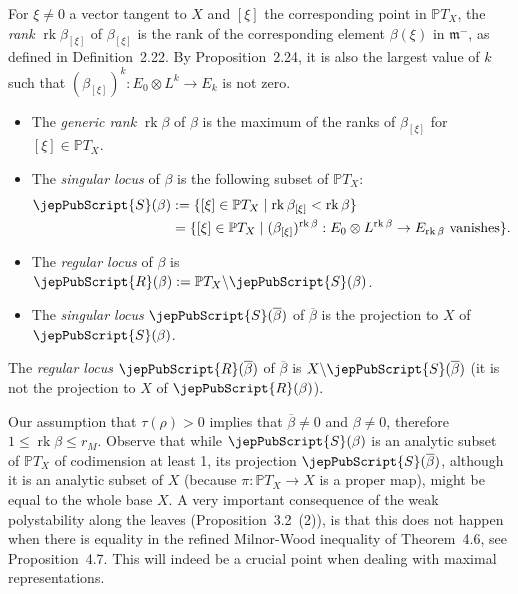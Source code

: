 \begin{definition}
For $\xi\neq0$ a vector tangent to $X$ and $[\xi]$ the corresponding point in $\mathbb PT_X$, the \emph{rank} $\operatorname{rk}\beta_{[\xi]}$ of $\beta_{[\xi]}$ is the rank of the corresponding element $\beta(\xi)$ in $\mathfrak m^-$, as defined in Definition~2.22. By Proposition~2.24, it is also the largest value of $k$ such that $(\beta_{[\xi]})^k:E_0\otimes L^k\to E_k$ is not zero.
\begin{itemize}
\item The \emph{generic rank} $\operatorname{rk}\beta$ of $\beta$ is the maximum of the ranks of $\beta_{[\xi]}$ for $[\xi]\in\mathbb PT_X$.
\item The \emph{singular locus} of $\beta$ is the following subset of $\mathbb PT_X$:
\begin{align*}
\jepPubScript{S}(\beta)&:=\{[\xi]\in\mathbb PT_X\mid\operatorname{rk}\beta_{[\xi]}<\operatorname{rk}\beta\}\\
&=\{[\xi]\in\mathbb PT_X\mid(\beta_{[\xi]})^{\operatorname{rk}\beta}:E_0\otimes L^{\operatorname{rk}\beta}\to E_{\operatorname{rk}\beta}\text{ vanishes}\}.
\end{align*}
\item The \emph{regular locus} of $\beta$ is $\jepPubScript{R}(\beta):=\mathbb PT_X\backslash\jepPubScript{S}(\beta)$.
\item The \emph{singular locus} $\jepPubScript{S}(\overline\beta)$ of $\overline\beta$ is the projection to $X$ of $\jepPubScript{S}(\beta)$.
\end{itemize}
The \emph{regular locus} $\jepPubScript{R}(\overline\beta)$ of $\overline\beta$ is $X\backslash\jepPubScript{S}(\overline\beta)$ (it is not the projection to $X$ of $\jepPubScript{R}(\beta)$).
\end{definition}
Our assumption that $\tau(\rho)>0$ implies that $\overline\beta\neq0$ and $\beta\neq0$, therefore $1\leqslant\operatorname{rk}\beta\leqslant r_M$. Observe that while $\jepPubScript{S}(\beta)$ is an analytic subset of $\mathbb PT_X$ of codimension at least 1, its projection $\jepPubScript{S}(\overline\beta)$, although it is an analytic subset of $X$ (because $\pi:\mathbb PT_X\to X$ is a proper map), might be equal to the whole base $X$. A very important consequence of the weak polystability along the leaves (Proposition~3.2~(2)), is that this does not happen when there is equality in the refined Milnor-Wood inequality of Theorem~4.6, see Proposition~4.7. This will indeed be a crucial point when dealing with maximal representations.
